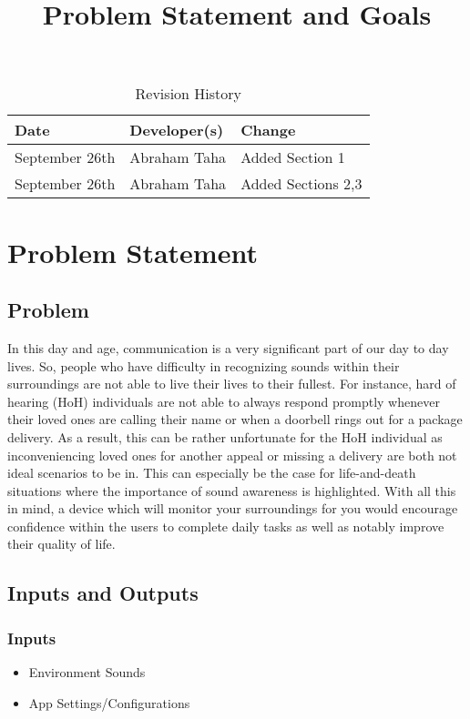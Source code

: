 \documentclass{article}
\title{Problem Statement and Goals\\\progname}
\author{\authname}
\date{}
\begin{document}
\maketitle

\begin{table}[hp]
\caption{Revision History} \label{TblRevisionHistory}
\begin{tabularx}{\textwidth}{llX}
\toprule
\textbf{Date} & \textbf{Developer(s)} & \textbf{Change}\\
\midrule
September 26th & Abraham Taha & Added Section 1\\
September 26th & Abraham Taha & Added Sections 2,3\\
\bottomrule
\end{tabularx}
\end{table}

\section{Problem Statement}

\subsection{Problem}
In this day and age, communication is a very significant part of our day to day lives. 
So, people who have difficulty in recognizing sounds within their surroundings are not 
able to live their lives to their fullest. For instance, hard of hearing (HoH) individuals 
are not able to always respond promptly whenever their loved ones are calling their name or
when a doorbell rings out for a package delivery. As a result, this can be rather unfortunate
for the HoH individual as inconveniencing loved ones for another appeal or missing a delivery
are both not ideal scenarios to be in. This can especially be the case for life-and-death 
situations where the importance of sound awareness is highlighted. With all this in mind, 
a device which will monitor your surroundings for you would encourage confidence within 
the users to complete daily tasks as well as notably improve their quality of life.
\subsection{Inputs and Outputs}

\subsubsection {Inputs}
\begin{itemize}
    \item Environment Sounds
    \item App Settings/Configurations
\end{itemize}
\end{document}
